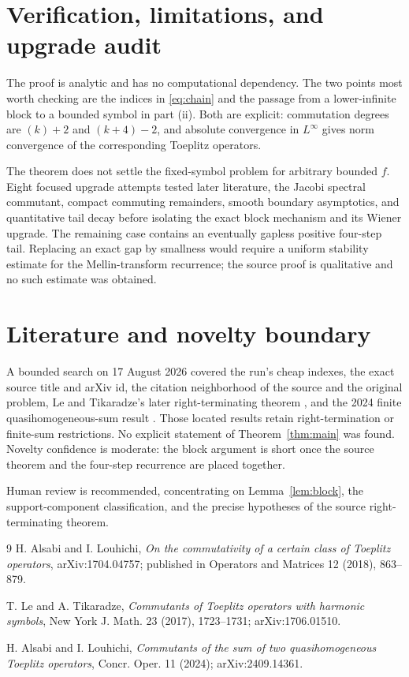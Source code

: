 \documentclass[11pt]{article}
\begin{document}
\section{Verification, limitations, and upgrade audit}

The proof is analytic and has no computational dependency.  The two points
most worth checking are the indices in \eqref{eq:chain} and the passage from a
lower-infinite block to a bounded symbol in part (ii).  Both are explicit:
commutation degrees are $(k)+2$ and $(k+4)-2$, and absolute convergence in
$L^\infty$ gives norm convergence of the corresponding Toeplitz operators.

The theorem does not settle the fixed-symbol problem for arbitrary bounded
$f$.  Eight focused upgrade attempts tested later literature, the Jacobi
spectral commutant, compact commuting remainders, smooth boundary
asymptotics, and quantitative tail decay before isolating the exact block
mechanism and its Wiener upgrade.  The remaining case contains an eventually
gapless positive four-step tail.  Replacing an exact gap by smallness would
require a uniform stability estimate for the Mellin-transform recurrence;
the source proof is qualitative and no such estimate was obtained.

\section{Literature and novelty boundary}

A bounded search on 17 August 2026 covered the run's cheap indexes, the exact
source title and arXiv id, the citation neighborhood of the source and the
original problem, Le and Tikaradze's later right-terminating theorem
\cite{LeTikaradze2017}, and the 2024 finite quasihomogeneous-sum result
\cite{AlsabiLouhichi2024}.  Those located results retain right-termination or
finite-sum restrictions.  No explicit statement of Theorem~\ref{thm:main}
was found.  Novelty confidence is moderate: the block argument is short once
the source theorem and the four-step recurrence are placed together.

Human review is recommended, concentrating on Lemma~\ref{lem:block}, the
support-component classification, and the precise hypotheses of the source
right-terminating theorem.

\sloppy
\begin{thebibliography}{9}
H. Alsabi and I. Louhichi,
\emph{On the commutativity of a certain class of Toeplitz operators},
arXiv:1704.04757; published in Operators and Matrices 12 (2018), 863--879.

T. Le and A. Tikaradze,
\emph{Commutants of Toeplitz operators with harmonic symbols},
New York J. Math. 23 (2017), 1723--1731; arXiv:1706.01510.

H. Alsabi and I. Louhichi,
\emph{Commutants of the sum of two quasihomogeneous Toeplitz operators},
Concr. Oper. 11 (2024); arXiv:2409.14361.
\end{thebibliography}
\end{document}
